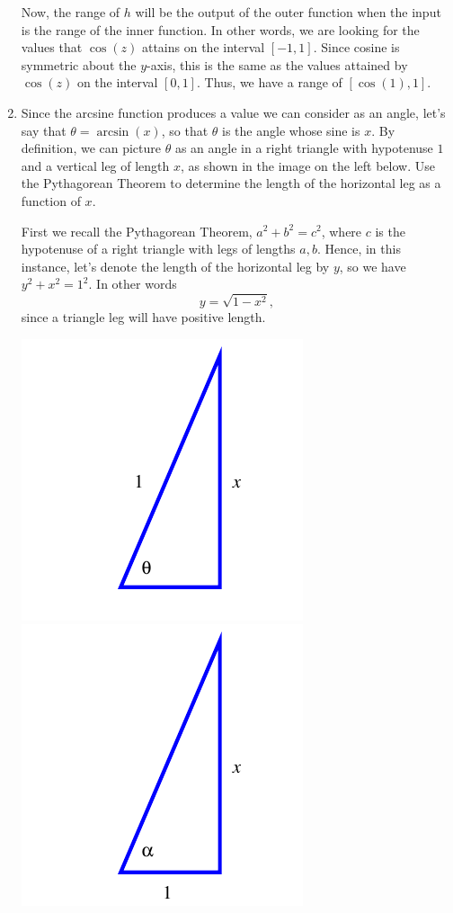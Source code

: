 \documentclass{ximera}
\begin{document}
\begin{example}
\begin{enumerate}
\begin{explanation}
Now, the range of $h$ will be the output of the outer function when the input is the range of the inner function. In other words, we are looking for the values that $\cos(z)$ attains on the interval $[-1,1]$. Since cosine is symmetric about the $y$-axis, this is the same as the values attained by $\cos(z)$ on the interval $[0,1]$. Thus, we have a range of $[\cos(1),1]$.
\end{explanation}
%
\item Since the arcsine function produces a value we can consider as an angle, let's say that $\theta = \arcsin(x)$,  so that $\theta$ is the angle whose sine is $x$.  By definition, we can picture $\theta$ as an angle in a right triangle with hypotenuse $1$ and a vertical leg of length $x$, as shown in the image on the left below.  Use the Pythagorean Theorem to determine the length of the horizontal leg as a function of $x$. \\
%
\begin{explanation}
First we recall the Pythagorean Theorem, $a^2 +b^2 = c^2$, where $c$ is the hypotenuse of a right triangle with legs of lengths $a,b$. Hence, in this instance, let's denote the length of the horizontal leg by $y$, so we have $y^2 + x^2 = 1^2$. In other words
%
$$y = \sqrt{1-x^2},$$
%
since a triangle leg will have positive length.
\end{explanation}
%
\begin{image}
\includegraphics{inv-trig-cosarcsin.pdf}
\includegraphics{inv-trig-cosarctan.pdf}
\end{image}%



\end{enumerate}
\end{example}
\end{document}
